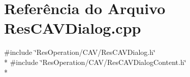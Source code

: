 \section{Referência do Arquivo Res\+C\+A\+V\+Dialog.\+cpp}
\label{_c_a_v_2_res_c_a_v_dialog_8cpp}
{\ttfamily \#include \char`\"{}Res\+Operation/\+C\+A\+V/\+Res\+C\+A\+V\+Dialog.\+h\char`\"{}}\\*
{\ttfamily \#include \char`\"{}Res\+Operation/\+C\+A\+V/\+Res\+C\+A\+V\+Dialog\+Content.\+h\char`\"{}}\\*
